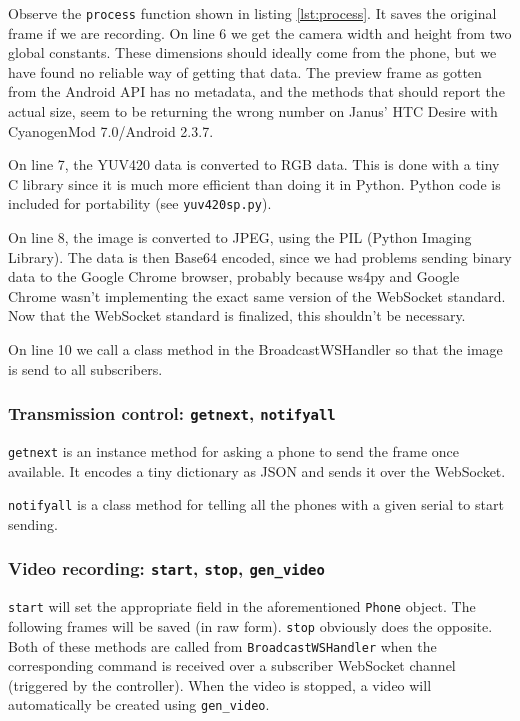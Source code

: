 \documentclass[a4paper]{report}
\newcommand{\classname}[1]{\texttt{#1}}
\newcommand{\methodname}[1]{\texttt{#1}}
\newcommand{\filename}[1]{\texttt{#1}}
\begin{document}
Observe the \methodname{process} function shown in listing \ref{lst:process}. It saves the original frame if we are recording. On line 6 we get the camera width and height from two global constants. These dimensions should ideally come from the phone, but we have found no reliable way of getting that data. The preview frame as gotten from the Android API has no metadata, and the methods that should report the actual size, seem to be returning the wrong number on Janus' HTC Desire with CyanogenMod 7.0/Android 2.3.7.

On line 7, the YUV420 data is converted to RGB data. This is done with a tiny C library since it is much more efficient than doing it in Python. Python code is included for portability (see \filename{yuv420sp.py}).

On line 8, the image is converted to JPEG, using the PIL (Python Imaging Library). The data is then Base64 encoded, since we had problems sending binary data to the Google Chrome browser, probably because ws4py and Google Chrome wasn't implementing the exact same version of the WebSocket standard. Now that the WebSocket standard is finalized, this shouldn't be necessary.

On line 10 we call a class method in the BroadcastWSHandler so that the image is send to all subscribers.

\subsubsection{Transmission control: \methodname{getnext}, \methodname{notifyall}}
\methodname{getnext} is an instance method for asking a phone to send the frame once available. It encodes a tiny dictionary as JSON and sends it over the WebSocket.

\methodname{notifyall} is a class method for telling all the phones with a given serial to start sending.

\subsubsection{Video recording: \methodname{start}, \methodname{stop}, \methodname{gen\_video}}
\methodname{start} will set the appropriate field in the aforementioned \classname{Phone} object. The following frames will be saved (in raw form). \methodname{stop} obviously does the opposite. Both of these methods are called from \classname{BroadcastWSHandler} when the corresponding command is received over a subscriber WebSocket channel (triggered by the controller). When the video is stopped, a video will automatically be created using \methodname{gen\_video}.
\end{document}

